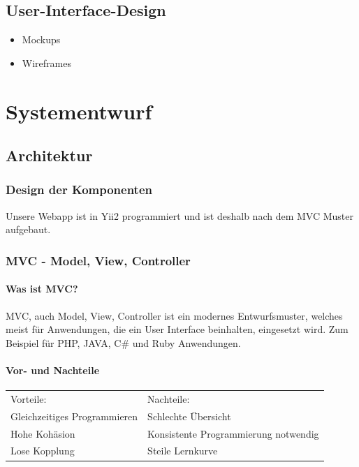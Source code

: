 \section{User-Interface-Design}
\begin{itemize}
	\item Mockups
	\item Wireframes
\end{itemize}


\chapter{Systementwurf}

\section{Architektur}
\def \currentAuthor{Florian Tipotsch}
\subsection{Design der Komponenten}

Unsere Webapp ist in Yii2 programmiert und ist deshalb nach dem MVC Muster aufgebaut.
\subsection{MVC - Model, View, Controller}\label{sec:MVC}

\subsubsection{Was ist MVC?} 
MVC, auch Model, View, Controller ist ein modernes Entwurfsmuster, welches meist für Anwendungen, die ein User Interface beinhalten, eingesetzt wird. Zum Beispiel für PHP, JAVA, C\# und Ruby Anwendungen. \cite{MVC}

\subsubsection{Vor- und Nachteile}
\begin{tabular}{ l l }
	Vorteile: & Nachteile: \\
	Gleichzeitiges Programmieren & Schlechte Übersicht \\
	Hohe Kohäsion \cite{kohaesion} & Konsistente Programmierung notwendig\\
	Lose Kopplung \cite{kopplung} & Steile Lernkurve \\	
\end{tabular}

